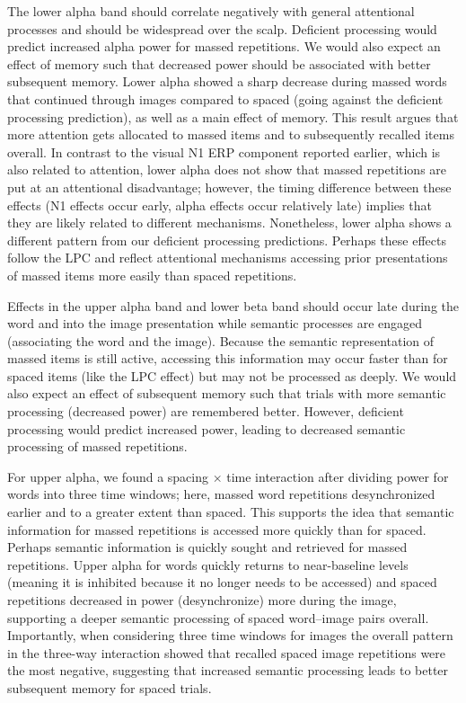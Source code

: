 The lower alpha band should correlate negatively with general attentional processes and should be widespread over the scalp.  Deficient processing would predict increased alpha power for massed repetitions.  We would also expect an effect of memory such that decreased power should be associated with better subsequent memory.
Lower alpha showed a sharp decrease during massed words that continued through images compared to spaced (going against the deficient processing prediction), as well as a main effect of memory.  This result argues that more attention gets allocated to massed items and to subsequently recalled items overall.  In contrast to the visual N1 ERP component reported earlier, which is also related to attention, lower alpha does not show that massed repetitions are put at an attentional disadvantage; however, the timing difference between these effects (N1 effects occur early, alpha effects occur relatively late) implies that they are likely related to different mechanisms.
Nonetheless, lower alpha shows a different pattern from our deficient processing predictions.
Perhaps these effects follow the LPC and reflect attentional mechanisms accessing prior presentations of massed items more easily than spaced repetitions.

Effects in the upper alpha band and lower beta band should occur late during the word and into the image presentation while semantic processes are engaged (associating the word and the image).  Because the semantic representation of massed items is still active, accessing this information may occur faster than for spaced items (like the LPC effect) but may not be processed as deeply.  We would also expect an effect of subsequent memory such that trials with more semantic processing (decreased power) are remembered better.  However, deficient processing would predict increased power, leading to decreased semantic processing of massed repetitions.

For upper alpha, we found a spacing $\times$ time interaction after dividing power for words into three time windows; here, massed word repetitions desynchronized earlier and to a greater extent than spaced. This supports the idea that semantic information for massed repetitions is accessed more quickly than for spaced.  Perhaps semantic information is quickly sought and retrieved for massed repetitions.  Upper alpha for words quickly returns to near-baseline levels (meaning it is inhibited because it no longer needs to be accessed) and spaced repetitions decreased in power (desynchronize) more during the image, supporting a deeper semantic processing of spaced word--image pairs overall.  Importantly, when considering three time windows for images the overall pattern in the three-way interaction showed that recalled spaced image repetitions were the most negative, suggesting that increased semantic processing leads to better subsequent memory for spaced trials.

